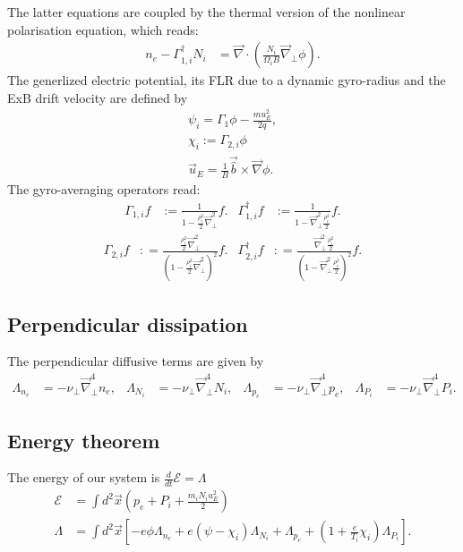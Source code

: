 The latter equations are coupled by the thermal version of the nonlinear polarisation equation, which reads:
\begin{align}
  n_e -\Gamma_{1,i}^\dagger N_i &= \vec{\nabla} \cdot\left(\frac{N_i}{\Omega_i B} \vec{\nabla}_\perp \phi\right).
\end{align}
The generlized electric potential, its FLR due to a dynamic gyro-radius and the ExB drift velocity are defined by
\begin{align}
 \psi_i  = \Gamma_{1} \phi - \frac{m u_E^2 }{2 q}, \\ 
 \chi_i := \Gamma_{2,i} \phi \\
 \vec{u}_E = \frac{1}{B} \vec{\hat{b}} \times \vec{\nabla} \phi .
\end{align}
The gyro-averaging operators read:
\begin{align}\label{eq:gamma1def} 
 \Gamma_{1,i} f&:= \frac{1}{1-\frac{\rho_i^2}{2}\vec{\nabla}_\perp^2} f. & 
  \Gamma_{1,i}^\dagger f&:= \frac{1}{1-\vec{\nabla}_\perp^2\frac{\rho_i^2}{2}} f.
\end{align}
\begin{align}\label{eq:gamma2def}
 \Gamma_{2,i} f&: = \frac{\frac{\rho_i^2}{2}\vec{\nabla}_\perp^2}{\left(1-\frac{\rho_i^2}{2}\vec{\nabla}_\perp^2\right)^2} f.&
 \Gamma_{2,i}^\dagger f&: = \frac{\vec{\nabla}_\perp^2\frac{\rho_i^2}{2}}{\left(1-\vec{\nabla}_\perp^2\frac{\rho_i^2}{2}\right)^2} f. 
\end{align}
\subsection{Perpendicular dissipation}
The perpendicular diffusive terms are given by
\begin{align}\label{eq:perpdiffNT}
 \Lambda_{n_e} &=  -\nu_\perp \vec{\nabla}_\perp^4 n_e, &
 \Lambda_{N_i} &=  -\nu_\perp \vec{\nabla}_\perp^4 N_i, &
 \Lambda_{p_e} &=  -\nu_\perp \vec{\nabla}_\perp^4 p_e, &
 \Lambda_{P_i} &=  -\nu_\perp \vec{\nabla}_\perp^4 P_i.
\end{align}
\subsection{Energy theorem}
The energy of our system is \(\frac{d}{d t}\mathcal{E}=\Lambda\)
\begin{align}
 \mathcal{E} &= \int d^2 \vec{x} \left( p_e + P_i + \frac{m_i N_i u_E^2}{2} \right)\\
 \Lambda &= \int d^2 \vec{x} \left[- e \phi \Lambda_{n_e} + e\left( \psi -\chi_i\right) \Lambda_{N_i} + \Lambda_{p_e} + \left(1+ \frac{e}{T_i}\chi_i\right)\Lambda_{P_i} \right].
\end{align}
